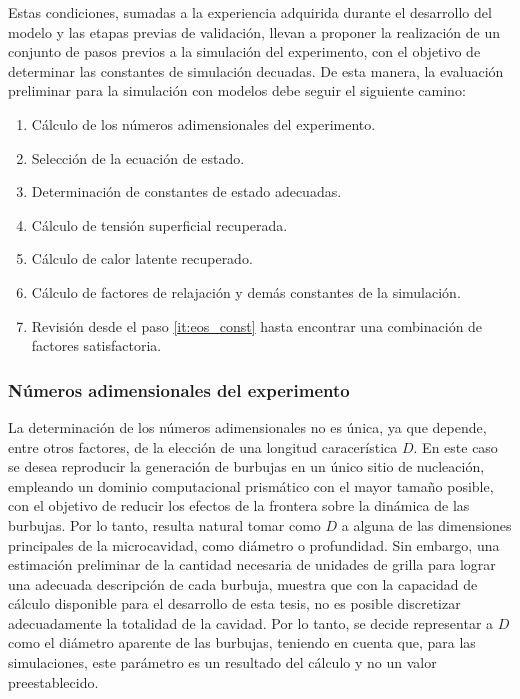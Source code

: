 Estas condiciones, sumadas a la experiencia adquirida durante el desarrollo del modelo y las etapas previas de validaci\'on, llevan a proponer la realizaci\'on de un conjunto de pasos previos a la simulaci\'on del experimento, con el objetivo de determinar las constantes de simulaci\'on decuadas. De esta manera, la evaluaci\'on preliminar para la simulaci\'on con modelos \pp{} debe seguir el siguiente camino:
\begin{enumerate}
	\item C\'alculo de los n\'umeros adimensionales del experimento.
	\item Selecci\'on de la ecuaci\'on de estado.
	\item Determinaci\'on de constantes de estado adecuadas. \label{it:eos_const}
	\item C\'alculo de tensi\'on superficial recuperada.
	\item C\'alculo de calor latente recuperado.
	\item C\'alculo de factores de relajaci\'on y dem\'as constantes de la simulaci\'on.
	\item Revisi\'on desde el paso \ref{it:eos_const} hasta encontrar una combinaci\'on de factores satisfactoria.
\end{enumerate}


\subsubsection{N\'umeros adimensionales del experimento}

La determinaci\'on de los n\'umeros adimensionales no es \'unica, ya que depende, entre otros factores, de la elecci\'on de una longitud caracer\'istica $D$. En este caso se desea reproducir la generaci\'on de burbujas en un \'unico sitio de nucleaci\'on, empleando un dominio computacional prism\'atico con el mayor tama\~no posible, con el objetivo de reducir los efectos de la frontera sobre la din\'amica de las burbujas. Por lo tanto, resulta natural tomar como $D$ a alguna de las dimensiones principales de la microcavidad, como di\'ametro o profundidad. Sin embargo, una estimaci\'on preliminar de la cantidad necesaria de unidades de grilla para lograr una adecuada descripci\'on de cada burbuja, muestra que con la capacidad de c\'alculo disponible para el desarrollo de esta tesis, no es posible discretizar adecuadamente la totalidad de la cavidad. Por lo tanto, se decide representar a $D$ como el di\'ametro aparente de las burbujas, teniendo en cuenta que, para las simulaciones, este par\'ametro es un resultado del c\'alculo y no un valor preestablecido.

